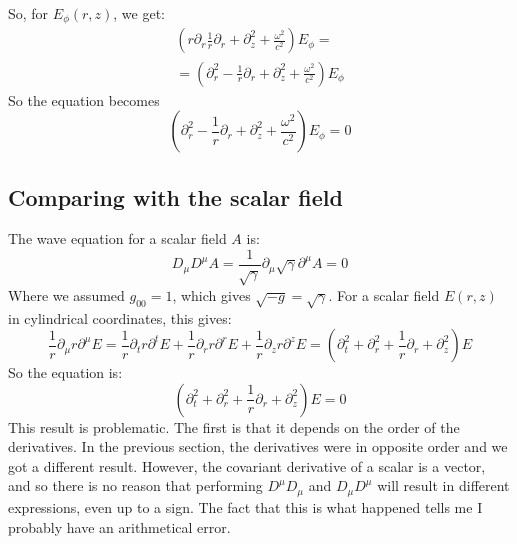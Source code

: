 \documentclass{article}
\begin{document}
So, for $E_\phi(r,z)$, we get:
\begin{equation}
\begin{gathered}
    \left(r\partial_r \frac{1}{r}\partial_r + \partial^2_z + \frac{\omega^2}{c^2}\right) E_\phi = \\ = 
    \left(\partial_r^2 - \frac{1}{r}\partial_r + \partial^2_z + \frac{\omega^2}{c^2}\right) E_\phi
\end{gathered}
\end{equation}
So the equation becomes
\begin{equation}
    \left(\partial_r^2 - \frac{1}{r}\partial_r + \partial^2_z + \frac{\omega^2}{c^2}\right) E_\phi = 0
\end{equation}

\subsection{Comparing with the scalar field}
The wave equation for a scalar field $A$ is:
\begin{equation}
    D_\mu D^\mu A = \frac{1}{\sqrt{\gamma}}\partial_\mu \sqrt{\gamma}\partial^\mu A = 0
\end{equation}
Where we assumed $g_{00} = 1$, which gives $\sqrt{-g} = \sqrt{\gamma}$. For a scalar field $E(r,z)$ in cylindrical coordinates, this gives:
\begin{equation}
    \frac{1}{r}\partial_\mu r \partial^\mu E = \frac{1}{r}\partial_t r \partial^t E + \frac{1}{r}\partial_r r \partial^r E + \frac{1}{r}\partial_z r \partial^z E = \left(\partial_t^2 + \partial_r^2 + \frac{1}{r}\partial_r +  \partial_z^2 \right) E
\end{equation}
So the equation is:
\begin{equation}
    \left(\partial_t^2 + \partial_r^2 + \frac{1}{r}\partial_r +  \partial_z^2 \right) E = 0
\end{equation}
This result is problematic. The first is that it depends on the order of the derivatives. In the previous section, the derivatives were in opposite order and we got a different result. However, the covariant derivative of a scalar is a vector, and so there is no reason that performing $D^\mu D_\mu$ and $D_\mu D^\mu$ will result in different expressions, even up to a sign. The fact that this is what happened tells me I probably have an arithmetical error.
\end{document}
